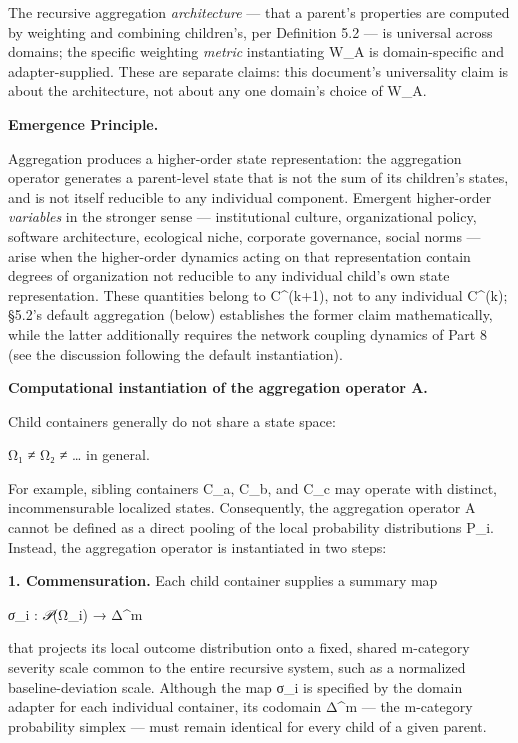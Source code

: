 \documentclass[
]{article}
\begin{document}
The recursive aggregation \emph{architecture} --- that a parent's
properties are computed by weighting and combining children's, per
Definition 5.2 --- is universal across domains; the specific weighting
\emph{metric} instantiating W\_A is domain-specific and
adapter-supplied. These are separate claims: this document's
universality claim is about the architecture, not about any one domain's
choice of W\_A.

\textbf{Emergence Principle.}

Aggregation produces a higher-order state representation: the
aggregation operator generates a parent-level state that is not the sum
of its children's states, and is not itself reducible to any individual
component. Emergent higher-order \emph{variables} in the stronger sense
--- institutional culture, organizational policy, software architecture,
ecological niche, corporate governance, social norms --- arise when the
higher-order dynamics acting on that representation contain degrees of
organization not reducible to any individual child's own state
representation. These quantities belong to C\^{}(k+1), not to any
individual C\^{}(k); §5.2's default aggregation (below) establishes the
former claim mathematically, while the latter additionally requires the
network coupling dynamics of Part 8 (see the discussion following the
default instantiation).

\textbf{Computational instantiation of the aggregation operator A.}

Child containers generally do not share a state space:

Ω₁ ≠ Ω₂ ≠ \ldots{} in general.

For example, sibling containers C\_a, C\_b, and C\_c may operate with
distinct, incommensurable localized states. Consequently, the
aggregation operator A cannot be defined as a direct pooling of the
local probability distributions P\_i. Instead, the aggregation operator
is instantiated in two steps:

\textbf{1. Commensuration.} Each child container supplies a summary map

\emph{σ}\_i : \emph{𝒫}(Ω\_i) → Δ\^{}m

that projects its local outcome distribution onto a fixed, shared
m-category severity scale common to the entire recursive system, such as
a normalized baseline-deviation scale. Although the map σ\_i is
specified by the domain adapter for each individual container, its
codomain Δ\^{}m --- the m-category probability simplex --- must remain
identical for every child of a given parent.
\end{document}
